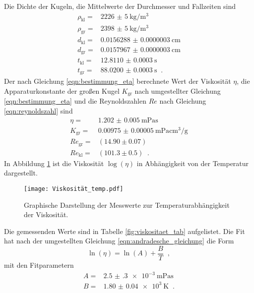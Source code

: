 Die Dichte der Kugeln, die Mittelwerte der Durchmesser und Fallzeiten sind
\begin{align*}
  \rho_{\text{kl}}=&\SI[per-mode=fraction]{2226(5)}{\kilo\gram\per\cubic\meter}\\
  \rho_{\text{gr}}=&\SI[per-mode=fraction]{2398(5)}{\kilo\gram\per\cubic\meter}\\
  d_{\text{kl}}=&\SI[per-mode=fraction]{0.0156288(3)}{\centi\meter}\\
  d_{\text{gr}}=&\SI[per-mode=fraction]{0.0157967(3)}{\centi\meter}\\
  t_{\text{kl}}=&\SI[per-mode=fraction]{12.8110(3)}{\second}\\
  t_{\text{gr}}=&\SI[per-mode=fraction]{88.0200(3)}{\second}\;\;.
\end{align*}
Der nach Gleichung \eqref{eqn:bestimmung_eta} berechnete Wert der Viskosität $\eta$, die Apparaturkonstante der
großen Kugel $K_{\text{gr}}$ nach umgestellter Gleichung \eqref{eqn:bestimmung_eta} und die Reynoldszahlen $Re$ nach Gleichung
\eqref{eqn:reynoldszahl} sind
\begin{align*}
  \eta=&\SI{1.202(5)}{\meter\pascal\second}\\
  K_{\text{gr}}=&\SI[per-mode=fraction]{0.00975(5)}{\meter\pascal\centi\cubic\meter\per\gram}\\
  Re_{\text{gr}}=&(14.90\pm0.07)\\
  Re_{\text{kl}}=&(101.3\pm0.5)\;\;.
  \label{eqn:etaKRE}
\end{align*}
In Abbildung \ref{fig:Viskositaet} ist die Viskosität $\log(\eta)$
in Abhängigkeit von der Temperatur dargestellt.
\begin{figure}
  \centering
  \texttt{[image: Viskosität\_temp.pdf]}
  \caption{Graphische Darstellung der Messwerte zur Temperaturabhängigkeit der Viskosität.}
  \label{fig:Viskositaet}
\end{figure}
Die gemessenden Werte sind in Tabelle \ref{fig:viskositaet_tab} aufgelistet. Die Fit hat
nach der umgestellten Gleichung \eqref{eqn:andradesche_gleichung} die Form
\begin{equation}
  \ln(\eta)=\ln(A)+\frac{B}{T}\;\;,
\end{equation}
mit den Fitparametern
\begin{align*}
  A=&\SI{2.5(3)e-3}{\meter\pascal\second}\\
  B=&\SI[per-mode=fraction]{ 1.80(4)e3}{\kelvin}\;\;.
\end{align*}
